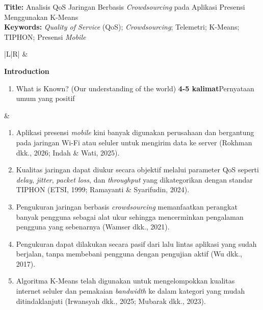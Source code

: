 \documentclass[11pt,a4paper]{article}
\newcommand{\kepala}{\multicolumn{1}{|c|}{\textbf{Component}} & \multicolumn{1}{c|}{\textbf{Content}}\\ \hline}
\begin{document}
\textbf{Title:} Analisis QoS Jaringan Berbasis \textit{Crowdsourcing} pada Aplikasi Presensi Menggunakan K-Means\\
\textbf{Keywords:} \textit{Quality of Service} (QoS); \textit{Crowdsourcing}; Telemetri; K-Means; TIPHON; Presensi \textit{Mobile}

\vspace{6pt}
\begin{longtable}{|L|R|}
\hline
\kepala
\endhead

\textbf{Introduction}
\begin{enumerate}[label=\arabic*.]
\item What is Known? (Our understanding of the world) \textbf{4-5 kalimat}\newline Pernyataan umum yang positif
\end{enumerate}
&
\begin{enumerate}[label=\arabic*.]
\item Aplikasi presensi \textit{mobile} kini banyak digunakan perusahaan dan bergantung pada jaringan Wi-Fi atau seluler untuk mengirim data ke server (Rokhman dkk., 2026; Indah \& Wati, 2025).
\item Kualitas jaringan dapat diukur secara objektif melalui parameter QoS seperti \textit{delay}, \textit{jitter}, \textit{packet loss}, dan \textit{throughput} yang dikategorikan dengan standar TIPHON (ETSI, 1999; Ramayanti \& Syarifudin, 2024).
\item Pengukuran jaringan berbasis \textit{crowdsourcing} memanfaatkan perangkat banyak pengguna sebagai alat ukur sehingga mencerminkan pengalaman pengguna yang sebenarnya (Wamser dkk., 2021).
\item Pengukuran dapat dilakukan secara pasif dari lalu lintas aplikasi yang sudah berjalan, tanpa membebani pengguna dengan pengujian aktif (Wu dkk., 2017).
\item Algoritma K-Means telah digunakan untuk mengelompokkan kualitas internet seluler dan pemakaian \textit{bandwidth} ke dalam kategori yang mudah ditindaklanjuti (Irwansyah dkk., 2025; Mubarak dkk., 2023).
\end{enumerate}
\\ \hline


\end{longtable}
\end{document}
